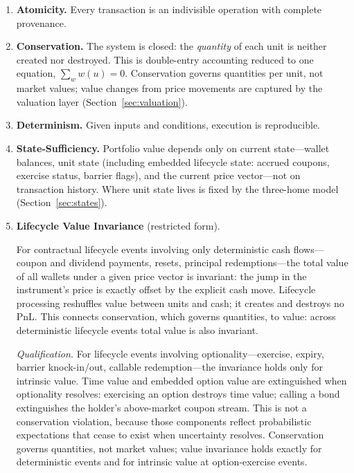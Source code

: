 \documentclass[11pt,a4paper]{article}
\begin{document}
\begin{enumerate}
\item \textbf{Atomicity.} Every transaction is an indivisible operation with complete provenance.

\item \textbf{Conservation.} The system is closed: the \emph{quantity} of each unit is neither created nor destroyed. This is double-entry accounting reduced to one equation, $\sum_w w(u) = 0$. Conservation governs quantities per unit, not market values; value changes from price movements are captured by the valuation layer (Section~\ref{sec:valuation}).

\item \textbf{Determinism.} Given inputs and conditions, execution is reproducible.

\item \textbf{State-Sufficiency.} Portfolio value depends only on current state---wallet balances, unit state (including embedded lifecycle state: accrued coupons, exercise status, barrier flags), and the current price vector---not on transaction history. Where unit state lives is fixed by the three-home model (Section~\ref{sec:states}).

\item \textbf{Lifecycle Value Invariance} (restricted form). \label{prop:lifecycle-value-invariance} {\setlength{\emergencystretch}{2em}For contractual lifecycle events involving only deterministic cash flows---\allowbreak coupon and dividend payments, resets, principal redemptions---\allowbreak the total value of all wallets under a given price vector is invariant: the jump in the instrument's price is exactly offset by the explicit cash move. Lifecycle processing reshuffles value between units and cash; it creates and destroys no PnL. This connects conservation, which governs quantities, to value: across deterministic lifecycle events total value is also invariant.\par}

\textit{Qualification.} For lifecycle events involving optionality---exercise, expiry, barrier knock-in/out, callable redemption---the invariance holds only for intrinsic value. Time value and embedded option value are extinguished when optionality resolves: exercising an option destroys time value; calling a bond extinguishes the holder's above-market coupon stream. This is not a conservation violation, because those components reflect probabilistic expectations that cease to exist when uncertainty resolves. Conservation governs quantities, not market values; value invariance holds exactly for deterministic events and for intrinsic value at option-exercise events.


\end{enumerate}
\end{document}

